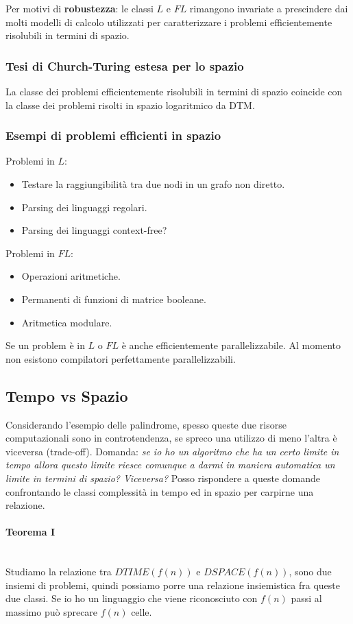 \documentclass{article}
\begin{document}
Per motivi di \textbf{robustezza}: le classi $L$ e $FL$ rimangono invariate a prescindere dai molti modelli
di calcolo utilizzati per caratterizzare i problemi efficientemente risolubili in termini di spazio.

\subsubsection{Tesi di Church-Turing estesa per lo spazio}
La classe dei problemi efficientemente risolubili in termini di spazio coincide con la classe dei problemi
risolti in spazio logaritmico da DTM.

\subsubsection{Esempi di problemi efficienti in spazio}
Problemi in $L$:
\begin{itemize}
    \item Testare la raggiungibilità tra due nodi in un grafo non diretto.
    \item Parsing dei linguaggi regolari.
    \item Parsing dei linguaggi context-free?
\end{itemize}
Problemi in $FL$:
\begin{itemize}
    \item Operazioni aritmetiche.
    \item Permanenti di funzioni di matrice booleane.
    \item Aritmetica modulare.
\end{itemize}

Se un problem è in $L$ o $FL$ è anche efficientemente parallelizzabile. Al momento non esistono compilatori
perfettamente parallelizzabili.

\subsection{Tempo vs Spazio}
Considerando l'esempio delle palindrome, spesso queste due risorse computazionali sono in controtendenza,
se spreco una utilizzo di meno l'altra è viceversa (trade-off). Domanda: \textit{se io ho
    un algoritmo che ha un certo limite in tempo allora questo limite riesce comunque a darmi
    in maniera automatica un limite in termini di spazio? Viceversa?}
Posso rispondere a queste domande confrontando le classi complessità in tempo ed in spazio per
carpirne una relazione.

\paragraph{Teorema I}\mbox{}\\
Studiamo la relazione tra $DTIME(f(n))$ e $DSPACE(f(n))$, sono due insiemi di problemi, quindi
possiamo porre una relazione insiemistica fra queste due classi. Se io ho un linguaggio
che viene riconosciuto con $f(n)$ passi al massimo può sprecare $f(n)$ celle.
\end{document}
